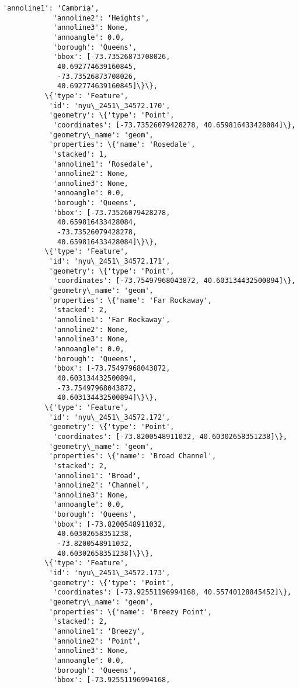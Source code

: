 \documentclass[11pt]{article}
\begin{document}
\begin{Verbatim}[commandchars=\\\{\}]
            'annoline1': 'Cambria',
            'annoline2': 'Heights',
            'annoline3': None,
            'annoangle': 0.0,
            'borough': 'Queens',
            'bbox': [-73.73526873708026,
             40.692774639160845,
             -73.73526873708026,
             40.692774639160845]\}\},
          \{'type': 'Feature',
           'id': 'nyu\_2451\_34572.170',
           'geometry': \{'type': 'Point',
            'coordinates': [-73.73526079428278, 40.659816433428084]\},
           'geometry\_name': 'geom',
           'properties': \{'name': 'Rosedale',
            'stacked': 1,
            'annoline1': 'Rosedale',
            'annoline2': None,
            'annoline3': None,
            'annoangle': 0.0,
            'borough': 'Queens',
            'bbox': [-73.73526079428278,
             40.659816433428084,
             -73.73526079428278,
             40.659816433428084]\}\},
          \{'type': 'Feature',
           'id': 'nyu\_2451\_34572.171',
           'geometry': \{'type': 'Point',
            'coordinates': [-73.75497968043872, 40.603134432500894]\},
           'geometry\_name': 'geom',
           'properties': \{'name': 'Far Rockaway',
            'stacked': 2,
            'annoline1': 'Far Rockaway',
            'annoline2': None,
            'annoline3': None,
            'annoangle': 0.0,
            'borough': 'Queens',
            'bbox': [-73.75497968043872,
             40.603134432500894,
             -73.75497968043872,
             40.603134432500894]\}\},
          \{'type': 'Feature',
           'id': 'nyu\_2451\_34572.172',
           'geometry': \{'type': 'Point',
            'coordinates': [-73.8200548911032, 40.60302658351238]\},
           'geometry\_name': 'geom',
           'properties': \{'name': 'Broad Channel',
            'stacked': 2,
            'annoline1': 'Broad',
            'annoline2': 'Channel',
            'annoline3': None,
            'annoangle': 0.0,
            'borough': 'Queens',
            'bbox': [-73.8200548911032,
             40.60302658351238,
             -73.8200548911032,
             40.60302658351238]\}\},
          \{'type': 'Feature',
           'id': 'nyu\_2451\_34572.173',
           'geometry': \{'type': 'Point',
            'coordinates': [-73.92551196994168, 40.55740128845452]\},
           'geometry\_name': 'geom',
           'properties': \{'name': 'Breezy Point',
            'stacked': 2,
            'annoline1': 'Breezy',
            'annoline2': 'Point',
            'annoline3': None,
            'annoangle': 0.0,
            'borough': 'Queens',
            'bbox': [-73.92551196994168,

\end{Verbatim}
\end{document}
